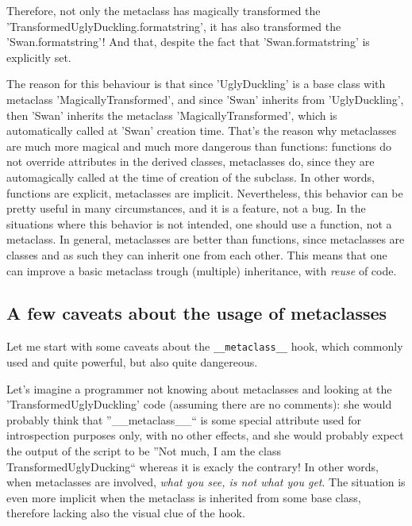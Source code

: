 \documentclass[10pt,english]{article}
\begin{document}
Therefore,  not only the metaclass has magically transformed the 
'TransformedUglyDuckling.formatstring', it has also transformed the 
'Swan.formatstring'! And that, despite the fact that 
'Swan.formatstring' is explicitly set.

The reason for this behaviour is that since 'UglyDuckling' is a base 
class with metaclass 'MagicallyTransformed', and since 'Swan' inherits from
'UglyDuckling', then 'Swan' inherits the metaclass 'MagicallyTransformed',
which is automatically called at 'Swan' creation time.
That's the reason why metaclasses are much more magical and much 
more dangerous than
functions: functions do not override attributes in the derived classes,
metaclasses do, since they are automagically called at the time of
creation of the subclass. In other words, functions are explicit,
metaclasses are implicit. Nevertheless, this behavior can be pretty
useful in many circumstances, and it is a feature, not a bug. In the
situations where this behavior is not intended, one should use a function,
not a metaclass. In general, metaclasses are better than functions,
since metaclasses are classes and as such they can inherit one from each 
other. This means that one can improve a basic metaclass trough 
(multiple) inheritance, with \emph{reuse} of code.



\hypertarget{a-few-caveats-about-the-usage-of-metaclasses}{}
\subsection*{A few caveats about the usage of metaclasses}

Let me start with some caveats about the \texttt{{\_}{\_}metaclass{\_}{\_}} hook, which
commonly used and quite powerful, but also quite dangereous.

Let's imagine a programmer not
knowing about metaclasses and looking at the 'TransformedUglyDuckling'
code (assuming there are no comments): she would probably think
that ''{\_}{\_}metaclass{\_}{\_}`` is some special attribute used for introspection
purposes only, with no other effects, and she would probably expect
the output of the script to be ''Not much, I am the class 
TransformedUglyDucking`` whereas it is exacly the contrary! In other
words, when metaclasses are involved,  \emph{what you see, is not what you get}.
The situation is even more implicit when the metaclass is inherited
from some base class, therefore lacking also the visual clue of the hook.
\end{document}
